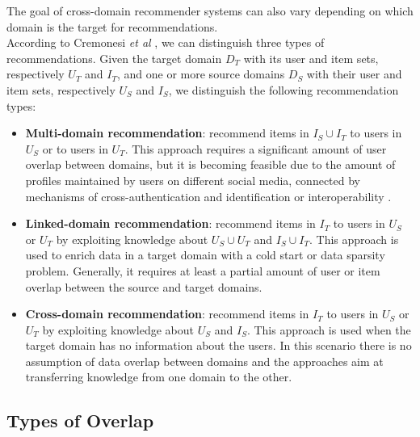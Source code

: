 The goal of cross-domain recommender systems can also vary depending on which domain is the target for recommendations.\\
According to Cremonesi \textit{et al} \cite{10.1007/978-1-4899-7637-6_27}, we can distinguish three types of recommendations. Given the target domain $D_T$ with its user and item sets, respectively $U_T$ and $I_T$, and one or more source domains $D_S$ with their user and item sets, respectively $U_S$ and $I_S$, we distinguish the following recommendation types:
\begin{itemize}
\item \textbf{Multi-domain recommendation}: recommend items in $I_S \cup I_T$ to users in $U_S$ or to users in $U_T$. This approach requires a significant amount of user overlap between domains, but it is becoming feasible due to the amount of profiles maintained by users on different social media, connected by mechanisms of cross-authentication and identification \cite{10.1016/j.ins.2008.08.022} or interoperability \cite{10.1007/s11257-011-9097-5}.
\item \textbf{Linked-domain recommendation}: recommend items in $I_T$ to users in $U_S$ or $U_T$ by exploiting knowledge about $U_S \cup U_T$ and $I_S \cup I_T$. This approach is used to enrich data in a target domain with a cold start or data sparsity problem. Generally, it requires at least a partial amount of user or item overlap between the source and target domains.
\item \textbf{Cross-domain recommendation}: recommend items in $I_T$ to users in $U_S$ or $U_T$ by exploiting knowledge about $U_S$ and $I_S$. This approach is used when the target domain has no information about the users. In this scenario there is no assumption of data overlap between domains and the approaches aim at transferring knowledge from one domain to the other.
\end{itemize}


\subsection{Types of Overlap}

